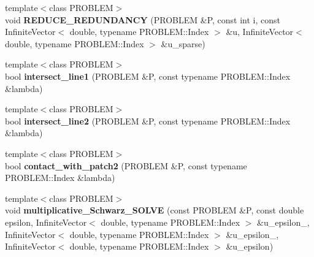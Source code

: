 \begin{CompactItemize}
\item 
\hypertarget{namespaceFrameTL_f10c19e668efd734a36e982750184b11}{
{\footnotesize template$<$class PROBLEM$>$ }\\void \textbf{REDUCE\_\-REDUNDANCY} (PROBLEM \&P, const int i, const InfiniteVector$<$ double, typename PROBLEM::Index $>$ \&u, InfiniteVector$<$ double, typename PROBLEM::Index $>$ \&u\_\-sparse)}
\label{namespaceFrameTL_f10c19e668efd734a36e982750184b11}

\item 
\hypertarget{namespaceFrameTL_6d0fc5d89ccc66faf29046d3bcfe3475}{
{\footnotesize template$<$class PROBLEM$>$ }\\bool \textbf{intersect\_\-line1} (PROBLEM \&P, const typename PROBLEM::Index \&lambda)}
\label{namespaceFrameTL_6d0fc5d89ccc66faf29046d3bcfe3475}

\item 
\hypertarget{namespaceFrameTL_7ba0009c3b5505a7a9a720663d21526d}{
{\footnotesize template$<$class PROBLEM$>$ }\\bool \textbf{intersect\_\-line2} (PROBLEM \&P, const typename PROBLEM::Index \&lambda)}
\label{namespaceFrameTL_7ba0009c3b5505a7a9a720663d21526d}

\item 
\hypertarget{namespaceFrameTL_30434f281b420f817ba55886c5b1bd82}{
{\footnotesize template$<$class PROBLEM$>$ }\\bool \textbf{contact\_\-with\_\-patch2} (PROBLEM \&P, const typename PROBLEM::Index \&lambda)}
\label{namespaceFrameTL_30434f281b420f817ba55886c5b1bd82}

\item 
\hypertarget{namespaceFrameTL_8d41aa77fa6da618ad97ddc75c920a55}{
{\footnotesize template$<$class PROBLEM$>$ }\\void \textbf{multiplicative\_\-Schwarz\_\-SOLVE} (const PROBLEM \&P, const double epsilon, InfiniteVector$<$ double, typename PROBLEM::Index $>$ \&u\_\-epsilon\_, InfiniteVector$<$ double, typename PROBLEM::Index $>$ \&u\_\-epsilon\_, InfiniteVector$<$ double, typename PROBLEM::Index $>$ \&u\_\-epsilon)}
\label{namespaceFrameTL_8d41aa77fa6da618ad97ddc75c920a55}


\end{CompactItemize}
